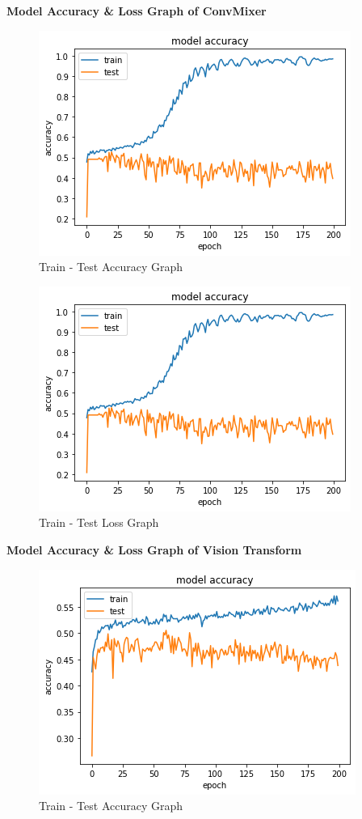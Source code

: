 \documentclass{article}
\begin{document}
\textbf{\large Model Accuracy \& Loss Graph of ConvMixer}
\begin{figure}[H]
    \begin{center}
        \includegraphics[scale=0.6]{Assets/accuracy_convmixer.png}
        \caption{Train - Test Accuracy Graph}
    \end{center}
\end{figure}
\begin{figure}[H]
    \begin{center}
        \includegraphics[scale=0.6]{Assets/accuracy_convmixer.png}
        \caption{Train - Test Loss Graph}
    \end{center}
\end{figure}
\vspace{1.38cm}
\textbf{\large Model Accuracy \& Loss Graph of Vision Transform}
\begin{figure}[H]
    \begin{center}
        \includegraphics[scale=0.6]{Assets/accuracy_vt.png}
        \caption{Train - Test Accuracy Graph}
    \end{center}
\end{figure}
\end{document}
